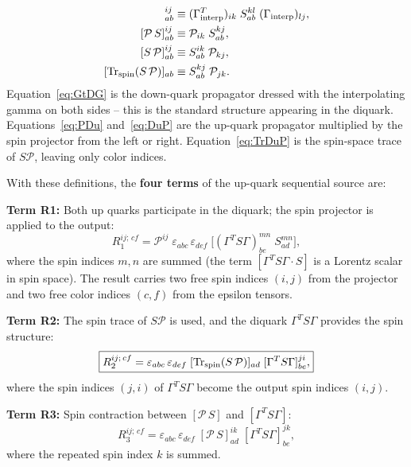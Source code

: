\documentclass[11pt,a4paper]{article}
\newcommand{\eps}{\varepsilon}
\newcommand{\Gint}{\Gamma_{\text{interp}}}
\newcommand{\PolProj}{\mathcal{P}}
\newcommand{\fwprop}{S}
\begin{document}
\begin{align}
  [\Gamma^{T}\!\fwprop\,\Gamma]^{ij}_{ab}
    &\equiv (\Gint^{T})_{ik}\;\fwprop^{kl}_{ab}\;(\Gint)_{lj},
    \label{eq:GtDG} \\
  [\PolProj\,\fwprop]^{ij}_{ab}
    &\equiv \PolProj_{ik}\;\fwprop^{kj}_{ab},
    \label{eq:PDu} \\
  [\fwprop\,\PolProj]^{ij}_{ab}
    &\equiv \fwprop^{ik}_{ab}\;\PolProj_{kj},
    \label{eq:DuP} \\
  [\Tr_{\text{spin}}(\fwprop\,\PolProj)]_{ab}
    &\equiv \fwprop^{kj}_{ab}\;\PolProj_{jk}.
    \label{eq:TrDuP}
\end{align}
Equation~\eqref{eq:GtDG} is the down-quark propagator dressed with the
interpolating gamma on both sides -- this is the standard structure appearing
in the diquark.  Equations~\eqref{eq:PDu} and~\eqref{eq:DuP} are the up-quark
propagator multiplied by the spin projector from the left or right.
Equation~\eqref{eq:TrDuP} is the spin-space trace of $\fwprop\PolProj$, leaving
only color indices.

\medskip\noindent
With these definitions, the \textbf{four terms} of the up-quark sequential source
are:

\medskip\noindent
\textbf{Term R1:} Both up quarks participate in the diquark; the spin projector
is applied to the output:
\begin{equation}
  \boxed{
  R_{1}^{ij;\,cf} = \PolProj^{ij}\;
  \eps_{abc}\,\eps_{def}\;
  \Big[(\Gamma^{T}\fwprop\Gamma)^{mn}_{be}\;
        \fwprop^{mn}_{ad}\Big],
  }
  \label{eq:R1}
\end{equation}
where the spin indices $m,n$ are summed (the term $[\Gamma^{T}\fwprop\Gamma \cdot
\fwprop]$ is a Lorentz scalar in spin space).  The result carries two free spin
indices $(i,j)$ from the projector and two free color indices $(c,f)$ from the
epsilon tensors.

\medskip\noindent
\textbf{Term R2:} The spin trace of $\fwprop\PolProj$ is used, and the diquark
$\Gamma^{T}\fwprop\Gamma$ provides the spin structure:
\begin{equation}
  \boxed{
  R_{2}^{ij;\,cf} =
  \eps_{abc}\,\eps_{def}\;
  [\Tr_{\text{spin}}(\fwprop\,\PolProj)]_{ad}\;
  [\Gamma^{T}\fwprop\Gamma]^{ji}_{be},
  }
  \label{eq:R2}
\end{equation}
where the spin indices $(j,i)$ of $\Gamma^{T}\fwprop\Gamma$ become the output
spin indices $(i,j)$.

\medskip\noindent
\textbf{Term R3:} Spin contraction between $[\PolProj\,\fwprop]$ and
$[\Gamma^{T}\fwprop\Gamma]$:
\begin{equation}
  \boxed{
  R_{3}^{ij;\,cf} =
  \eps_{abc}\,\eps_{def}\;
  [\PolProj\,\fwprop]^{ik}_{ad}\;
  [\Gamma^{T}\fwprop\Gamma]^{jk}_{be},
  }
  \label{eq:R3}
\end{equation}
where the repeated spin index $k$ is summed.
\end{document}
